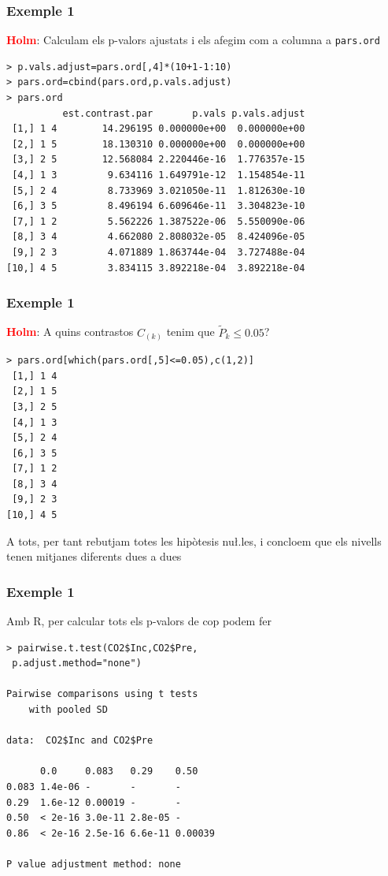 \documentclass[12pt,t]{beamer}
\newcommand{\red}[1]{\textcolor{red}{#1}}
\renewcommand{\leq}{\leqslant}
\theoremstyle{plain}
\theoremstyle{definition}
\begin{document}
\begin{frame}[fragile]
\frametitle{Exemple 1}
\vspace*{-2ex}

\red{\bf Holm}: Calculam els p-valors ajustats i els afegim com a columna a \texttt{pars.ord} 
{\footnotesize \begin{verbatim}
> p.vals.adjust=pars.ord[,4]*(10+1-1:10)
> pars.ord=cbind(pars.ord,p.vals.adjust)
> pars.ord
          est.contrast.par       p.vals p.vals.adjust
 [1,] 1 4        14.296195 0.000000e+00  0.000000e+00
 [2,] 1 5        18.130310 0.000000e+00  0.000000e+00
 [3,] 2 5        12.568084 2.220446e-16  1.776357e-15
 [4,] 1 3         9.634116 1.649791e-12  1.154854e-11
 [5,] 2 4         8.733969 3.021050e-11  1.812630e-10
 [6,] 3 5         8.496194 6.609646e-11  3.304823e-10
 [7,] 1 2         5.562226 1.387522e-06  5.550090e-06
 [8,] 3 4         4.662080 2.808032e-05  8.424096e-05
 [9,] 2 3         4.071889 1.863744e-04  3.727488e-04
[10,] 4 5         3.834115 3.892218e-04  3.892218e-04
\end{verbatim}
}
\end{frame}




\begin{frame}[fragile]
\frametitle{Exemple 1}
\vspace*{-2ex}

\red{\bf Holm}: A quins contrastos $C_{(k)}$ tenim que $\widetilde{P}_{k}\leq 0.05$?
{\small \begin{verbatim}
> pars.ord[which(pars.ord[,5]<=0.05),c(1,2)]  
 [1,] 1 4
 [2,] 1 5
 [3,] 2 5
 [4,] 1 3
 [5,] 2 4
 [6,] 3 5
 [7,] 1 2
 [8,] 3 4
 [9,] 2 3
[10,] 4 5
\end{verbatim}
}
A tots, per tant rebutjam totes les hipòtesis nu\l.les, i concloem que els nivells tenen mitjanes diferents dues a dues

\end{frame}





\begin{frame}[fragile]
\frametitle{Exemple 1}

Amb R, per calcular tots els p-valors de cop podem  fer 
{\small \begin{verbatim}
> pairwise.t.test(CO2$Inc,CO2$Pre,
 p.adjust.method="none")

Pairwise comparisons using t tests 
	with pooled SD 

data:  CO2$Inc and CO2$Pre 

      0.0     0.083   0.29    0.50   
0.083 1.4e-06 -       -       -      
0.29  1.6e-12 0.00019 -       -      
0.50  < 2e-16 3.0e-11 2.8e-05 -      
0.86  < 2e-16 2.5e-16 6.6e-11 0.00039

P value adjustment method: none 
\end{verbatim}
}


\end{frame}
\end{document}
